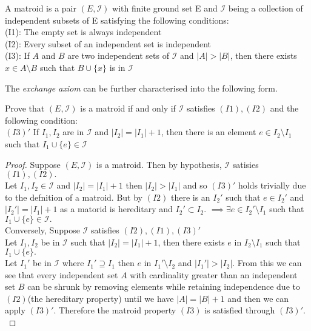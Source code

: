 \documentclass[../main.tex]{subfiles}
\begin{document}
\begin{defn}
A matroid is a pair $(E,\mathcal{I})$ with finite ground set E and $\mathcal{I}$ being a collection of independent subsets of E satisfying the following conditions:\\
\noindent (I1): The empty set is always independent\\
\noindent (I2): Every subset of an independent set is independent\\
\noindent (I3): If $ A $ and $ B $ are two independent sets of $\mathcal{I}$ and $|A|>|B|$, then there exists $x \in A \setminus B$ such that $B \cup \{ x \}$ is in $\mathcal{I}$
\end{defn}
The \textit{exchange axiom} can be further characterised into the following form.
\begin{lem}
Prove that $(E,\mathcal{I})$ is a matroid if and only if $\mathcal{I}$ satisfies $(I1), (I2)$ and the following condition:\\
\noindent $(I3)'$ If $I_1,I_2$ are in $\mathcal{I}$ and $|I_2|=|I_1|+1$, then there is an element $e \in I_2 \setminus I_1$ such that $I_1 \cup \{e\} \in \mathcal{I}$
\end{lem}
\begin{proof}
Suppose $(E,\mathcal{I})$ is a matroid. Then by hypothesis, $\mathcal{I}$ satisies $(I1),(I2).$\\
\noindent Let $I_1,I_2 \in \mathcal{I}$ and $|I_2|=|I_1|+1$ then $|I_2|>|I_1|$ and so $(I3)'$ holds trivially due to the defnition of a matroid.
\noindent But by $(I2)$ there is an $I_2'$ such that $e \in I_2'$ and $|I_2'|=|I_1|+1$ as a matorid is hereditary and $I_2' \subset I_2.$
$\implies \exists e \in I_2' \setminus I_1$ such that $I_1 \cup \{e\} \in \mathcal{I}.$\\
Conversely, Suppose $\mathcal{I}$ satisfies $(I2),(I1),(I3)'$\\
Let $I_1,I_2$ be in $\mathcal{I}$ such that $|I_2|=|I_1|+1$, then there exists $e$ in $I_2 \setminus I_1$ such that $I_1 \cup \{e\}.$\\
Let $I_1'$ be in $\mathcal{I}$ where $I_1' \supseteq I_1$ then $e$ in $I_1' \setminus I_2$ and $|I_1'|>|I_2|.$ From this we can see that every independent set $A$ with cardinality greater than an independent set $B$ can be shrunk by removing elements while retaining independence due to $(I2)$(the hereditary property) until we have $|A|=|B|+1$ and then we can apply $(I3)'.$ Therefore the matroid property $(I3)$ is satisfied through $(I3)'.$
\end{proof}
\end{document}
